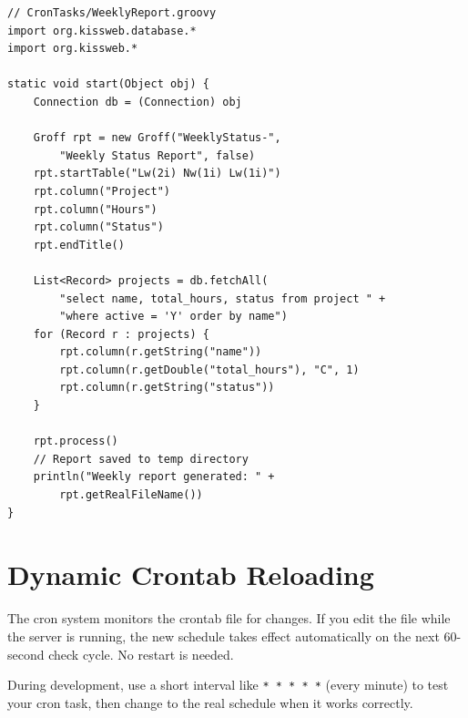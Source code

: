 \begin{lstlisting}[style=groovy]
// CronTasks/WeeklyReport.groovy
import org.kissweb.database.*
import org.kissweb.*

static void start(Object obj) {
    Connection db = (Connection) obj

    Groff rpt = new Groff("WeeklyStatus-",
        "Weekly Status Report", false)
    rpt.startTable("Lw(2i) Nw(1i) Lw(1i)")
    rpt.column("Project")
    rpt.column("Hours")
    rpt.column("Status")
    rpt.endTitle()

    List<Record> projects = db.fetchAll(
        "select name, total_hours, status from project " +
        "where active = 'Y' order by name")
    for (Record r : projects) {
        rpt.column(r.getString("name"))
        rpt.column(r.getDouble("total_hours"), "C", 1)
        rpt.column(r.getString("status"))
    }

    rpt.process()
    // Report saved to temp directory
    println("Weekly report generated: " +
        rpt.getRealFileName())
}
\end{lstlisting}

\section{Dynamic Crontab Reloading}
\label{sec:cron-reload}

The cron system monitors the crontab file for changes.  If you edit the file while the server is running, the new schedule takes effect automatically on the next 60-second check cycle.  No restart is needed.

\begin{tipbox}
During development, use a short interval like \texttt{* * * * *} (every minute) to test your cron task, then change to the real schedule when it works correctly.
\end{tipbox}
